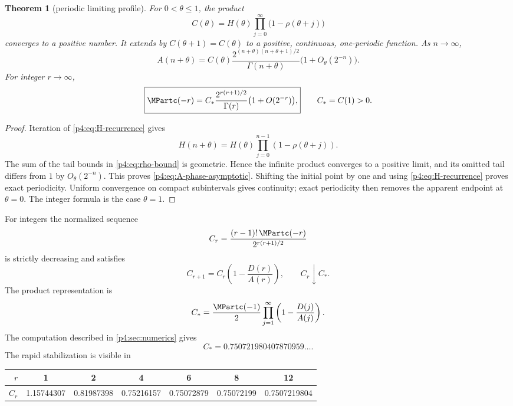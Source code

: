 \documentclass[11pt,oneside]{article}
\newtheorem{theorem}{Theorem}[section]
\theoremstyle{definition}
\theoremstyle{remark}
\newcommand{\1}{\mathbf 1}
\begin{document}
\begin{theorem}[periodic limiting profile]\label{p4:thm:phase-limit}
For \(0<\theta\le1\), the product
\begin{equation}\label{p4:eq:Ctheta-product}
 C(\theta)=H(\theta)
 \prod_{j=0}^{\infty}\bigl(1-\rho(\theta+j)\bigr)
\end{equation}
converges to a positive number.  It extends by \(C(\theta+1)=C(\theta)\) to a
positive, continuous, one-periodic function.  As \(n\to\infty\),
\begin{equation}\label{p4:eq:A-phase-asymptotic}
 A(n+\theta)=C(\theta)
 \frac{2^{(n+\theta)(n+\theta+1)/2}}{\Gamma(n+\theta)}
 \bigl(1+O_\theta(2^{-n})\bigr).
\end{equation}
For integer \(r\to\infty\),
\begin{equation}\label{p4:eq:integer-negative-asymptotic}
 \boxed{\displaystyle
 \MPartc(-r)=C_*\frac{2^{r(r+1)/2}}{\Gamma(r)}
 \bigl(1+O(2^{-r})\bigr),}
 \qquad C_*=C(1)>0.
\end{equation}
\end{theorem}

\begin{proof}
Iteration of \cref{p4:eq:H-recurrence} gives
\[
 H(n+\theta)=H(\theta)
 \prod_{j=0}^{n-1}(1-\rho(\theta+j)).
\]
The sum of the tail bounds in \cref{p4:eq:rho-bound} is geometric.  Hence the infinite
product converges to a positive limit, and its omitted tail differs from \(1\) by
\(O_\theta(2^{-n})\).  This proves \cref{p4:eq:A-phase-asymptotic}.  Shifting the
initial point by one and using \cref{p4:eq:H-recurrence} proves exact periodicity.
Uniform convergence on compact subintervals gives continuity; exact periodicity
then removes the apparent endpoint at \(\theta=0\).
The integer formula is the case \(\theta=1\).
\end{proof}

For integers the normalized sequence
\begin{equation}\label{p4:eq:Cr-def}
 C_r=\frac{(r-1)!\,\MPartc(-r)}{2^{r(r+1)/2}}
\end{equation}
is strictly decreasing and satisfies
\begin{equation}\label{p4:eq:Cr-rec}
 C_{r+1}=C_r\left(1-\frac{D(r)}{A(r)}\right),
 \qquad C_r\downarrow C_*.
\end{equation}
The product representation is
\begin{equation}\label{p4:eq:Cstar-product}
 C_*=\frac{\MPartc(-1)}2
 \prod_{j=1}^{\infty}
 \left(1-\frac{D(j)}{A(j)}\right).
\end{equation}
The computation described in \cref{p4:sec:numerics} gives
\begin{equation}\label{p4:eq:Cstar-numeric}
 C_*=0.750721980407870959\ldots.
\end{equation}
The rapid stabilization is visible in
\begin{center}
\small
\begin{tabular}{@{}rcccccc@{}}
\toprule
\(r\)&1&2&4&6&8&12\\
\midrule
\(C_r\)&1.15744307&0.81987398&0.75216157&0.75072879&
0.75072199&0.7507219804\\
\bottomrule
\end{tabular}
\end{center}
\end{document}
